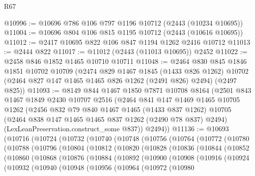 \begin{lexlean}{R67}
\begin{coremodule}
@10996 := @10696 @786 @106 @797 @1196 @10712 (@2443 (@10234 @10695))
@11004 := @10696 @804 @106 @815 @1195 @10712 (@2443 (@10616 @10695))
@11012 := @2417 @10695 @822 @106 @847 @1194 @1262 @2416 @10712
@11013 := @2444 @822
@11017 := @11012 (@2443 (@11013 @10695)) @2452
@11022 := @2458 @846 @1852 @1465 @10710 @10711
@11048 := @2464
    @830
    @845
    @1846
    @1851
    @10702
    @10709
    (@2474
      @829
      @1467
      @1845
      (@1433 @826 @1262)
      @10702
      (@2464 @827 @147 @1465 @1465 @826 @1262 (@2491 @826) @2494)
      (@2497 @825))
@11093 := @8149
    @844
    @1467
    @1850
    @7871
    @10708
    @8164
    (@2501
      @843
      @1467
      @1849
      @2430
      @10707
      @2516
      (@2464
        @841
        @147
        @1469
        @1465
        @10705
        @1262
        (@2456
          @832
          @79
          @840
          @1467
          @1465
          (@1433 @837 @1262)
          @10705
          (@2464 @838 @147 @1465 @1465 @837 @1262 (@2490 @78 @837) @2494)
          (LexLeanPreservation.construct_some @837))
        @2494))
@11136 := @10693
    (@10716
      (@10724
        (@10732
          (@10740
            (@10748
              (@10756
                (@10764
                  (@10772
                    (@10780
                      (@10788
                        (@10796
                          (@10804
                            (@10812
                              (@10820
                                (@10828
                                  (@10836
                                    (@10844
                                      (@10852
                                        (@10860
                                          (@10868
                                            (@10876
                                              (@10884
                                                (@10892
                                                  (@10900
                                                    (@10908
                                                      (@10916
                                                        (@10924
                                                          (@10932
                                                            (@10940
                                                              (@10948
                                                                (@10956
                                                                  (@10964
                                                                    (@10972
                                                                      (@10980

\end{coremodule}
\end{lexlean}
